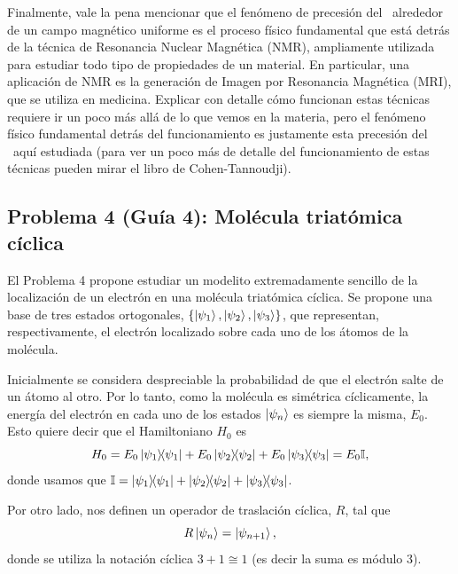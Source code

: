 \documentclass[10pt, a4paper]{article}
\numberwithin{equation}{subsection}
\begin{document}
\bigbreak

Finalmente, vale la pena mencionar que el fenómeno de precesión del \spin\
alrededor de un campo magnético uniforme es el proceso físico fundamental que
está detrás de la técnica de Resonancia Nuclear Magnética (NMR), ampliamente
utilizada para estudiar todo tipo de propiedades de un material. En particular,
una aplicación de NMR es la generación de Imagen por Resonancia Magnética
(MRI), que se utiliza en medicina. Explicar con detalle cómo funcionan estas
técnicas requiere ir un poco más allá de lo que vemos en la materia, pero el
fenómeno físico fundamental detrás del funcionamiento es justamente esta
precesión del \spin\ aquí estudiada (para ver un poco más de detalle del
funcionamiento de estas técnicas pueden mirar el libro de Cohen-Tannoudji).

\FloatBarrier

\subsection{Problema 4 (Guía 4): Molécula triatómica cíclica}

El Problema 4 propone estudiar un modelito extremadamente sencillo de la
localización de un electrón en una molécula triatómica cíclica. Se propone una
base de tres estados ortogonales, $\set{\ket{\psi_1}, \ket{\psi_2},
\ket{\psi_3}}$, que representan, respectivamente, el electrón localizado sobre
cada uno de los átomos de la molécula.

Inicialmente se considera despreciable la probabilidad de que el electrón salte
de un átomo al otro. Por lo tanto, como la molécula es simétrica cíclicamente,
la energía del electrón en cada uno de los estados $\ket{\psi_n}$ es siempre la
misma, $E_0$. Esto quiere decir que el Hamiltoniano $H_0$ es
\begin{equation} \label{eq:triatom_H0Id}
  H_0 = E_0\projector{\psi_1} + E_0\projector{\psi_2} + E_0\projector{\psi_3} =
  E_0\Id,
\end{equation}
donde usamos que $\Id = \projector{\psi_1} + \projector{\psi_2} +
\projector{\psi_3}$.

Por otro lado, nos definen un operador de traslación cíclica, $R$, tal que
\begin{equation}
  R\ket{\psi_n} = \ket{\psi_{n+1}},
\end{equation}
donde se utiliza la notación cíclica $3 + 1 \cong 1$ (es decir la suma es
módulo 3).
\end{document}
